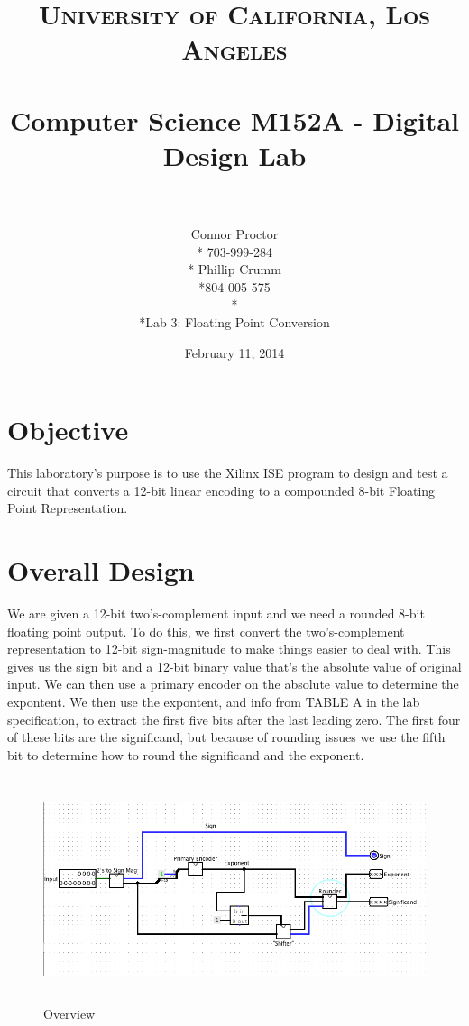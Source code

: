\documentclass[paper=letter, fontsize=11pt]{scrartcl}
\title{	
\normalfont \normalsize 
\textsc{University of California, Los Angeles} \\ [25pt]
\horrule{0.5pt} \\[0.4cm]
\Large Computer Science M152A - Digital Design Lab \\
\horrule{2pt} \\[0.5cm]
}
\author{Connor Proctor \\* 703-999-284 \\* Phillip Crumm \\*804-005-575 \\* \\*Lab 3: Floating Point Conversion}
\date{\normalsize February 11, 2014}
\begin{document}
\clearpage\maketitle
\thispagestyle{empty}
\pagebreak


\section{Objective}
This laboratory's purpose is to use the Xilinx ISE program to design and test a circuit that converts a 12-bit linear encoding to a compounded 8-bit Floating Point Representation.  

\section{Overall Design}
We are given a 12-bit two's-complement input and we need a rounded 8-bit floating point output. To do this, we first convert the two's-complement representation to 12-bit sign-magnitude to make things easier to deal with. This gives us the sign bit and a 12-bit binary value that's the absolute value of original input. We can then use a primary encoder on the absolute value to determine the expontent. We then use the expontent, and info from TABLE A in the lab specification, to extract the first five bits after the last leading zero. The first four of these bits are the significand, but because of rounding issues we use the fifth bit to determine how to round the significand and the exponent. 
\begin{figure}[H]
\includegraphics[height=66mm]{overall.png}
\centering
\caption{Overview}
\label{overflow}
\end{figure}
\end{document}
